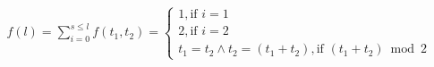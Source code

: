 \documentclass{article}
\begin{document}
\begin{align*}
    f(l) = \sum_{i=0}^{s \leq l}{
        f(t_{1}, t_{2}) = \begin{cases}
            1, \text{if } i = 1\\
            2, \text{if } i = 2\\
            t_{1} = t_{2} \land t_{2} = (t_{1} + t_{2}), \text{if } (t_{1} + t_{2}) \bmod 2
        \end{cases}
    }
\end{align*}
\end{document}
